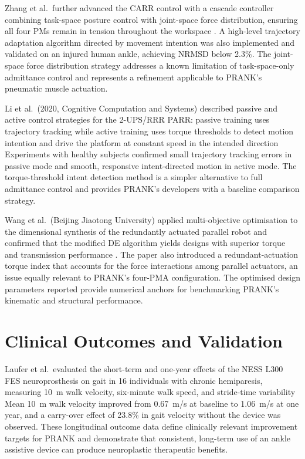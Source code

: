 Zhang et al.\ further advanced the CARR control with a cascade controller combining task-space posture control with joint-space force distribution, ensuring all four PMs remain in tension throughout the workspace \cite{Zhang2019}.
A high-level trajectory adaptation algorithm directed by movement intention was also implemented and validated on an injured human ankle, achieving NRMSD below 2.3\%.
The joint-space force distribution strategy addresses a known limitation of task-space-only admittance control and represents a refinement applicable to PRANK's pneumatic muscle actuation.

Li et al.\ (2020, Cognitive Computation and Systems) described passive and active control strategies for the 2-UPS/RRR PARR: passive training uses trajectory tracking while active training uses torque thresholds to detect motion intention and drive the platform at constant speed in the intended direction %
Experiments with healthy subjects confirmed small trajectory tracking errors in passive mode and smooth, responsive intent-directed motion in active mode.
The torque-threshold intent detection method is a simpler alternative to full admittance control and provides PRANK's developers with a baseline comparison strategy.

Wang et al.\ (Beijing Jiaotong University) applied multi-objective optimisation to the dimensional synthesis of the redundantly actuated parallel robot and confirmed that the modified DE algorithm yields designs with superior torque and transmission performance \cite{Wang2015}.
The paper also introduced a redundant-actuation torque index that accounts for the force interactions among parallel actuators, an issue equally relevant to PRANK's four-PMA configuration.
The optimised design parameters reported provide numerical anchors for benchmarking PRANK's kinematic and structural performance.

\section{Clinical Outcomes and Validation}

Laufer et al.\ evaluated the short-term and one-year effects of the NESS L300 FES neuroprosthesis on gait in 16 individuals with chronic hemiparesis, measuring 10~m walk velocity, six-minute walk speed, and stride-time variability %
Mean 10~m walk velocity improved from 0.67~m/s at baseline to 1.06~m/s at one year, and a carry-over effect of 23.8\% in gait velocity without the device was observed.
These longitudinal outcome data define clinically relevant improvement targets for PRANK and demonstrate that consistent, long-term use of an ankle assistive device can produce neuroplastic therapeutic benefits.

